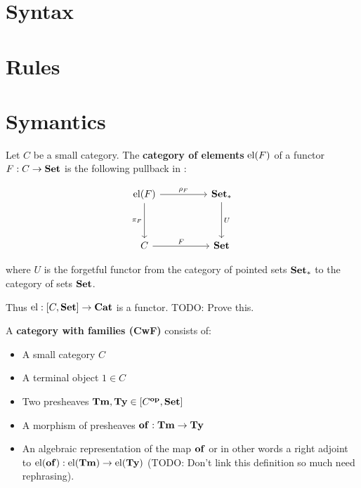
\section{Syntax}

\section{Rules}

\section{Symantics}

\begin{defin}
	Let $C$ be a small category. The {\bf category of elements} $\mathrm{el}(F)$ of a functor 
	$F : C \to {\normalfont\textbf{Set}}$ is the following pullback in \Cat:
	
	\begin{equation}
		\begin{tikzcd}
			\el(F) \arrow[dd, "\pi_F"'] \arrow[rr, "\rho_F"] &  & \Set_* \arrow[dd, "U"] \\
			&  &  \\
			C \arrow[rr, "F"] &  & \Set
		\end{tikzcd}
	\end{equation}

	where $U$ is the forgetful functor from the category of pointed sets 
	${\normalfont\textbf{Set}}_*$ to the category of sets ${\normalfont\textbf{Set}}$.
\end{defin}
Thus $\mathrm{el} : [C, {\normalfont\textbf{Set}}] \to {\normalfont\textbf{Cat}}$ is a functor. TODO: Prove this.


\begin{defin}
	A {\bf category with families (CwF)} consists of:
	\begin{itemize}
		\item A small category $C$
		\item A terminal object $1 \in C$
		\item Two presheaves $\mathbf{Tm}, \mathbf{Ty} \in [C^{\mathbf{op}}, {\normalfont\textbf{Set}}]$
		\item A morphism of presheaves $\mathbf{of} : \mathbf{Tm} \to \mathbf{Ty}$
		\item An algebraic representation of the map $\mathbf{of}$ or in other words
		a right adjoint to $\mathrm{el}(\mathbf{of}) : \mathrm{el}(\mathbf{Tm}) \to \mathrm{el}(\mathbf{Ty})$ (TODO: Don't link 
		this definition so much need rephrasing).
	\end{itemize}
\end{defin}


